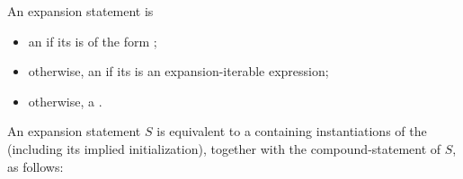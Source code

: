 \pnum
An expansion statement is
\begin{itemize}
\item
an  if its 
is of the form ;
\item
otherwise, an  if its 
is an expansion-iterable expression;
\item
otherwise, a .
\end{itemize}

\pnum
An expansion statement $S$ is equivalent to a 
containing instantiations of the 
(including its implied initialization),
together with the compound-statement of $S$, as follows:
